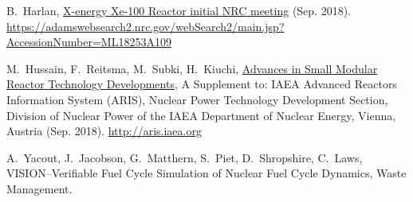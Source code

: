 \documentclass[preprint]{elsarticle}
\begin{document}
\begin{thebibliography}{10}
B.~Harlan,
  \href{https://adamswebsearch2.nrc.gov/webSearch2/main.jsp?AccessionNumber=ML18253A109}{X-energy
  {Xe}-100 {Reactor} initial {NRC} meeting} (Sep. 2018).
\newline\urlprefix\url{https://adamswebsearch2.nrc.gov/webSearch2/main.jsp?AccessionNumber=ML18253A109}

M.~Hussain, F.~Reitsma, M.~Subki, H.~Kiuchi,
  \href{http://aris.iaea.org}{Advances in {Small} {Modular} {Reactor}
  {Technology} {Developments}}, A {Supplement} to: {IAEA} {Advanced} {Reactors}
  {Information} {System} ({ARIS}), Nuclear Power Technology Development
  Section, Division of Nuclear Power of the IAEA Department of Nuclear Energy,
  Vienna, Austria (Sep. 2018).
\newline\urlprefix\url{http://aris.iaea.org}

A.~Yacout, J.~Jacobson, G.~Matthern, S.~Piet, D.~Shropshire, C.~Laws,
  {VISION}–{Verifiable} {Fuel} {Cycle} {Simulation} of {Nuclear} {Fuel}
  {Cycle} {Dynamics}, Waste Management.

\end{thebibliography}


%
\end{document}
